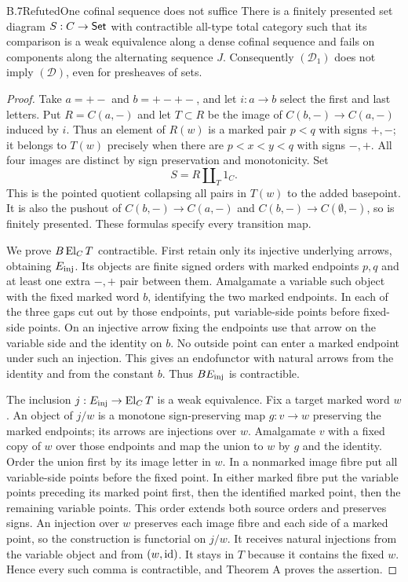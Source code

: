 \begin{claim}{B.7}{Refuted}{One cofinal sequence does not suffice}
\label{B:D1notD}
There is a finitely presented set diagram $S:C\to\mathsf{Set}$ with
contractible all-type total category such that its comparison
is a weak equivalence along a dense cofinal sequence and fails
on components along the alternating sequence $J$.
Consequently $(\mathcal D_1)$ does not imply $(\mathcal D)$,
even for presheaves of sets.
\end{claim}
\begin{proof}
Take $a=+-$ and $b=+-+-$, and let $i:a\to b$ select the first
and last letters. Put $R=C(a,-)$ and let $T\subset R$ be the
image of $C(b,-)\to C(a,-)$ induced by $i$. Thus an element of
$R(w)$ is a marked pair $p<q$ with signs $+,-$; it belongs to
$T(w)$ precisely when there are $p<x<y<q$ with signs $-,+$.
All four images are distinct by sign preservation and monotonicity.
Set
\[
                 S=R\amalg_T1_C.
 \tag{B.7.1}
\]
This is the pointed quotient collapsing all pairs in $T(w)$
to the added basepoint. It is also the pushout of
$C(b,-)\to C(a,-)$ and $C(b,-)\to C(\emptyset,-)$, so is
finitely presented. These formulas specify every transition map.

We prove $B\operatorname{El}_C T$ contractible. First retain only its
injective underlying arrows, obtaining $E_{\rm inj}$. Its
objects are finite signed orders with marked endpoints $p,q$
and at least one extra $-,+$ pair between them. Amalgamate a
variable such object with the fixed marked word $b$, identifying
the two marked endpoints. In each of the three gaps cut out
by those endpoints, put variable-side points before fixed-side
points. On an injective arrow fixing the endpoints use that
arrow on the variable side and the identity on $b$. No outside
point can enter a marked endpoint under such an injection.
This gives an endofunctor with natural arrows from the identity
and from the constant $b$. Thus $BE_{\rm inj}$ is contractible.

The inclusion $j:E_{\rm inj}\to\operatorname{El}_C T$ is a weak equivalence.
Fix a target marked word $w$. An object of $j/w$ is a monotone
sign-preserving map $g:v\to w$ preserving the marked endpoints;
its arrows are injections over $w$. Amalgamate $v$ with a fixed
copy of $w$ over those endpoints and map the union to $w$ by
$g$ and the identity. Order the union first by its image letter
in $w$. In a nonmarked image fibre put all variable-side points
before the fixed point. In either marked fibre put the variable
points preceding its marked point first, then the identified
marked point, then the remaining variable points. This order
extends both source orders and preserves signs. An injection
over $w$ preserves each image fibre and each side of a marked
point, so the construction is functorial on $j/w$. It receives
natural injections from the variable object and from $(w,\mathrm{id})$.
It stays in $T$ because it contains the fixed $w$. Hence every
such comma is contractible, and Theorem A proves the assertion.


\end{proof}
